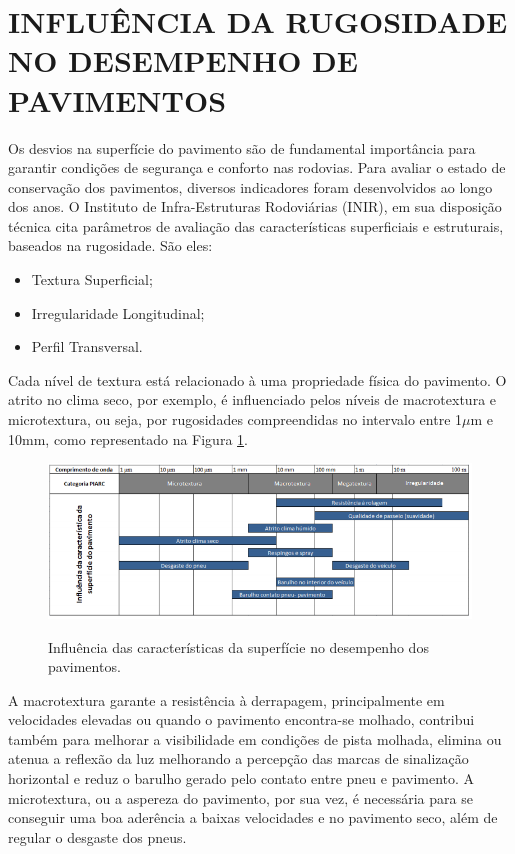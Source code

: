 \section{INFLUÊNCIA DA RUGOSIDADE NO DESEMPENHO DE PAVIMENTOS}
Os desvios na superfície do pavimento são de fundamental importância para garantir condições de segurança e conforto nas rodovias. Para avaliar o estado de conservação dos pavimentos, diversos indicadores foram desenvolvidos ao longo dos anos. O Instituto de Infra-Estruturas Rodoviárias (INIR), em sua disposição técnica  cita parâmetros de avaliação das características superficiais e estruturais, baseados na rugosidade. São eles:
\begin{itemize}
\item Textura Superficial;
\item Irregularidade Longitudinal;
\item Perfil Transversal. 
\end{itemize}

Cada nível de textura está relacionado à uma propriedade física do pavimento. O atrito no clima seco, por exemplo, é influenciado pelos níveis de macrotextura e microtextura, ou seja, por rugosidades compreendidas no intervalo  entre 1$\mu$m e 10mm, como representado na Figura \ref{Fig:influencia}.


\begin{figure}[!ht]
\centering
{\includegraphics[scale=0.8]{figures/influencia.jpg}}\\
\caption{Influência das características da superfície no desempenho dos pavimentos.} 
 \label{Fig:influencia}
\end{figure}

A macrotextura garante a resistência à derrapagem, principalmente em velocidades elevadas ou quando o pavimento encontra-se molhado, contribui também para melhorar a visibilidade em condições de pista molhada, elimina ou atenua a reflexão da luz melhorando a percepção das marcas de sinalização horizontal e reduz o barulho gerado pelo contato entre pneu e pavimento. A microtextura, ou a aspereza do pavimento, por sua vez, é necessária para se conseguir uma boa aderência a baixas velocidades e no pavimento seco, além de regular o desgaste dos pneus.

